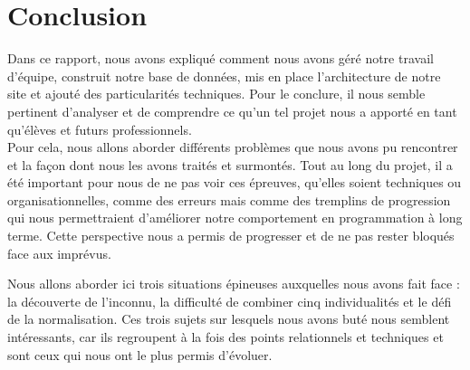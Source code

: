 \documentclass[12pt]{report}
\begin{document}
        \chapter{Conclusion}
        \par
        Dans ce rapport, nous avons expliqué comment nous avons géré notre travail d’équipe, construit notre base de données, mis en place l’architecture de notre site et ajouté des particularités techniques. Pour le conclure, il nous semble pertinent d’analyser et de comprendre ce qu’un tel projet nous a apporté en tant qu’élèves et futurs professionnels.\\Pour cela, nous allons aborder différents problèmes que nous avons pu rencontrer et la façon dont nous les avons traités et surmontés. Tout au long du projet, il a été important pour nous de ne pas voir ces épreuves, qu’elles soient techniques ou organisationnelles, comme des erreurs mais comme des tremplins de progression qui nous permettraient d’améliorer notre comportement en programmation à long terme. Cette perspective nous a permis de progresser et de ne pas rester bloqués face aux imprévus.
        \par
        Nous allons aborder ici trois situations épineuses auxquelles nous avons fait face : la découverte de l’inconnu, la difficulté de combiner cinq individualités et le défi de la normalisation. Ces trois sujets sur lesquels nous avons buté nous semblent intéressants, car ils regroupent à la fois des points relationnels et techniques et sont ceux qui nous ont le plus permis d’évoluer.
        
\end{document}
